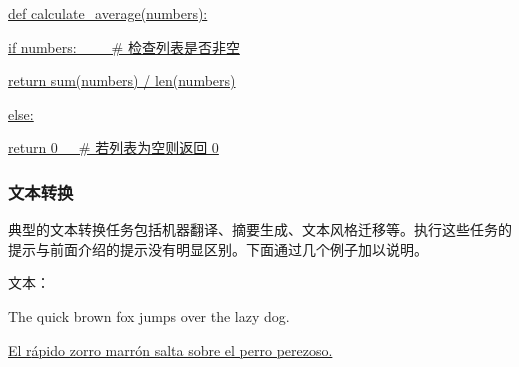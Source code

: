 \vspace{0.5em}
\begin{tcolorbox}

\begingroup
\setlength{\leftskip}{2em}
\setlength{\rightskip}{2em}


\vspace{0.7em}


\uline{def calculate\_average(numbers):}

\hspace{2em} \uline{if numbers:\ \ \ \ \ \# 检查列表是否非空}

\hspace{2em} \hspace{2em} \uline{return sum(numbers) / len(numbers)}

\hspace{2em} \uline{else:}

\hspace{2em} \hspace{2em} \uline{return 0\ \ \ \# 若列表为空则返回 0}

\endgroup

\end{tcolorbox}
\vspace{0.5em}

\subsubsection{文本转换}

\noindent 典型的文本转换任务包括机器翻译、摘要生成、文本风格迁移等。执行这些任务的提示与前面介绍的提示没有明显区别。下面通过几个例子加以说明。

\vspace{0.5em}
\begin{tcolorbox}

\begingroup
\setlength{\leftskip}{2em}
\setlength{\rightskip}{2em}


\vspace{0.7em}

文本：
\vspace{0.3em}

The quick brown fox jumps over the lazy dog.

\vspace{0.7em}

\underline{El r{\'a}pido zorro marr{\'o}n salta sobre el perro perezoso.}

\endgroup

\end{tcolorbox}
\vspace{0.5em}

